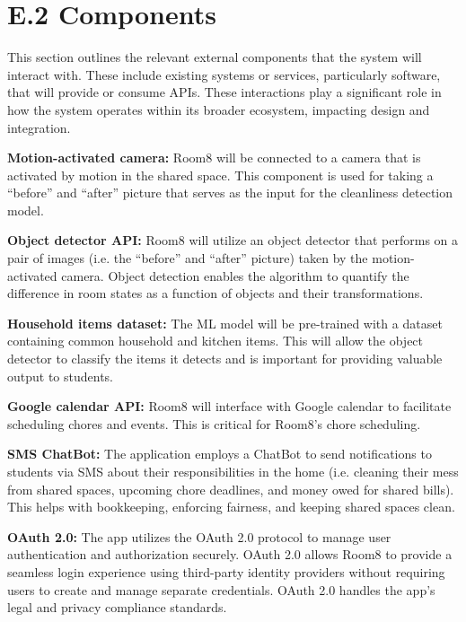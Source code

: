 \documentclass{scrreprt}
\newcommand*{\nsection}[1]{
    \section*{#1}
    \addcontentsline{toc}{section}{#1}
}
\theoremstyle{definition}
\begin{document}
\nsection{E.2 Components}
This section outlines the relevant external components that the system will interact with. These include existing systems or services, particularly software, that will provide or consume APIs. These interactions play a significant role in how the system operates within its broader ecosystem, impacting design and integration.
\begin{flushleft}
  \item \textbf{Motion-activated camera:} Room8 will be connected to a camera that is activated by motion in the shared space. This component is used for taking a “before” and “after” picture that serves as the input for the cleanliness detection model. \newline
  
  \item \textbf{Object detector API:} Room8 will utilize an object detector that performs on a pair of images (i.e. the “before” and “after” picture) taken by the motion-activated camera. Object detection enables the algorithm to quantify the difference in room states as a function of objects and their transformations.\newline 
  
  \item \textbf{Household items dataset:} The ML model will be pre-trained with a dataset containing common household and kitchen items. This will allow the object detector to classify the items it detects and is important for providing valuable output to students.\newline
   
  \item \textbf{Google calendar API:} Room8 will interface with Google calendar to facilitate scheduling chores and events. This is critical for Room8's chore scheduling.\newline

  \item \textbf{SMS ChatBot:} The application employs a ChatBot to send notifications to students via SMS about their responsibilities in the home (i.e. cleaning their mess from shared spaces, upcoming chore deadlines, and money owed for shared bills). This helps with bookkeeping, enforcing fairness, and keeping shared spaces clean.\newline

  \item \textbf{OAuth 2.0:} The app utilizes the OAuth 2.0 protocol to manage user authentication and authorization securely. OAuth 2.0 allows Room8 to provide a seamless login experience using third-party identity providers without requiring users to create and manage separate credentials. OAuth 2.0 handles the app’s legal and privacy compliance standards.\newline
  

\end{flushleft}
\end{document}
